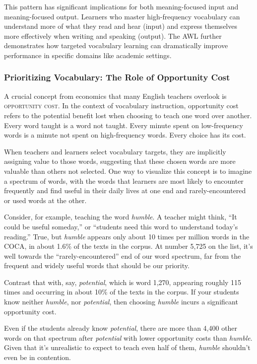This pattern has significant implications for both meaning-focused input and meaning-focused output. Learners who master high-frequency vocabulary can understand more of what they read and hear (input) and express themselves more effectively when writing and speaking (output). The AWL further demonstrates how targeted vocabulary learning can dramatically improve performance in specific domains like academic settings.

\subsubsection*{Prioritizing Vocabulary: The Role of Opportunity Cost} \label{sec:opportunity-cost}

A crucial concept from economics that many English teachers overlook is \textsc{opportunity cost}. In the context of vocabulary instruction, opportunity cost refers to the potential benefit lost when choosing to teach one word over another. Every word taught is a word not taught. Every minute spent on low-frequency words is a minute not spent on high-frequency words. Every choice has its cost.

When teachers and learners select vocabulary targets, they are implicitly assigning value to those words, suggesting that these chosen words are more valuable than others not selected. One way to visualize this concept is to imagine a spectrum of words, with the words that learners are most likely to encounter frequently and find useful in their daily lives at one end and rarely-encountered or used words at the other.

Consider, for example, teaching the word \textit{humble}. A teacher might think, ``It could be useful someday,'' or ``students need this word to understand today's reading.'' True, but \textit{humble} appears only about 10 times per million words in the COCA, in about 1.6\% of the texts in the corpus. At number 5,725 on the list, it's well towards the ``rarely-encountered'' end of our word spectrum, far from the frequent and widely useful words that should be our priority.

Contrast that with, say, \textit{potential}, which is word 1,270, appearing roughly 115 times and occurring in about 10\% of the texts in the corpus. If your students know neither \textit{humble}, nor \textit{potential}, then choosing \textit{humble} incurs a significant opportunity cost.

Even if the students already know \textit{potential}, there are more than 4,400 other words on that spectrum after \textit{potential} with lower opportunity costs than \textit{humble}. Given that it's unrealistic to expect to teach even half of them, \textit{humble} shouldn't even be in contention.

